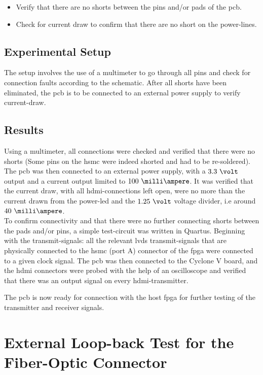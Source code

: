 \documentclass[main.tex]{subfiles}
\begin{document}
\begin{itemize}\setlength{\itemsep}{10pt}
\item Verify that there are no shorts between the pins and/or pads of the \gls{pcb}. 
\item Check for current draw to confirm that there are no short on the power-lines.
\end{itemize}

\subsection{Experimental Setup}

The setup involves the use of a multimeter to go through all pins and check for connection faults according to the schematic. After all shorts have been eliminated, the \gls{pcb} is to be connected to an external power supply to verify current-draw. 

\subsection{Results}
 Using a multimeter, all connections were checked and verified that there were no shorts (Some pins on the \gls{hsmc} were indeed shorted and had to be re-soldered). The \gls{pcb} was then connected to an external power supply, with a $3.3~\volt$ output and a current output limited to $100~\milli\ampere$. It was verified that the current draw, with all \gls{hdmi}-connections left open, were no more than the current drawn from the power-\acrshort{led} and the $1.25~\volt$ voltage divider, i.e around $40~\milli\ampere$. \\

To confirm connectivity and that there were no further connecting shorts between the pads and/or pins, a simple test-circuit was written in Quartus. Beginning with the transmit-signals: all the relevant \gls{lvds} transmit-signals that are physically connected to the \gls{hsmc} (port A) connector of the \gls{fpga} were connected to a given clock signal. The \gls{pcb} was then connected to the Cyclone V board, and the \gls{hdmi} connectors were probed with the help of an oscilloscope and verified that there was an output signal on every \gls{hdmi}-transmitter. 

The \gls{pcb} is now ready for connection with the host \gls{fpga} for further testing of the transmitter and receiver signals. 

\section{External Loop-back Test for the Fiber-Optic Connector} \label{sec:exlooptest}
\end{document}
